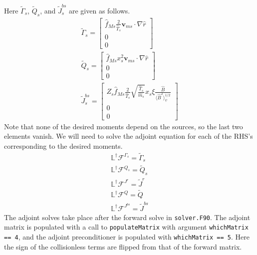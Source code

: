\documentclass[11pt]{amsart}
\begin{document}
Here $\tilde{\Gamma}_{s}$, $\tilde{Q}_s$, and $\tilde{J}^{bs}_s$ are given as follows.
\begin{gather}
\tilde{\Gamma}_{s} = \begin{bmatrix}
\hat{f}_{Ms} \frac{2}{\hat{T}_s} \bm{v}_{ms} \cdot \nabla \hat{r} \\ 
0 \\
0
\end{bmatrix} \\
\tilde{Q}_{s} = \begin{bmatrix}
\hat{f}_{Ms} x_s^2 \bm{v}_{ms} \cdot \nabla \hat{r}  \\
0 \\
0
\end{bmatrix} \\
\tilde{J}^{bs}_s = \begin{bmatrix}
Z_s \hat{f}_{M s} \frac{2}{\hat{T}_s} \sqrt{\frac{\hat{T}_s}{\hat{m}_s}} x_s \xi \frac{\hat{B}}{\langle \hat{B}^2 \rangle_{\psi}^{1/2}} \\
0 \\
0
\end{bmatrix}
\end{gather}
Note that none of the desired moments depend on the sources, so the last two elements vanish. We will need to solve the adjoint equation for each of the RHS's corresponding to the desired moments.
\begin{gather}
\mathbb{L}^{\dagger} \mathcal{F}^{\Gamma_{s}} = \tilde{\Gamma}_{s} \\
\mathbb{L}^{\dagger} \mathcal{F}^{Q_s} = \tilde{Q}_s \\
\mathbb{L}^{\dagger} \mathcal{F}^{J^r} = \tilde{J}^r \\
\mathbb{L}^{\dagger} \mathcal{F}^{Q} = \tilde{Q} \\
\mathbb{L}^{\dagger} \mathcal{F}^{J^{bs}} = \tilde{J}^{bs}
\end{gather}
The adjoint solves take place after the forward solve in \texttt{solver.F90}. The adjoint matrix is populated with a call to \texttt{populateMatrix} with argument \texttt{whichMatrix == 4}, and the adjoint preconditioner is populated with \texttt{whichMatrix == 5}. Here the sign of the collisionless terms are flipped from that of the forward matrix. 
\end{document}
